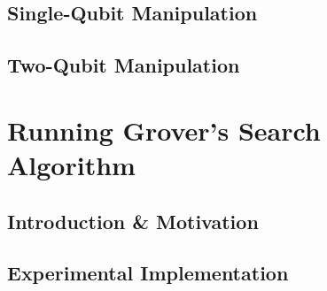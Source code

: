 
\subsection{Single-Qubit Manipulation}


\subsection{Two-Qubit Manipulation}





\section{Running Grover's Search Algorithm}


\subsection{Introduction \& Motivation}


\subsection{Experimental Implementation}

